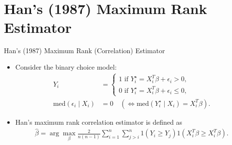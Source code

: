 \documentclass[xcolor=svgnames,dvipdfmx,cjk]{beamer}
\theoremstyle{example}
\begin{document}
\section{Han's (1987) Maximum Rank Estimator}
  
\begin{frame}{Han's (1987) Maximum Rank (Correlation) Estimator}
\begin{itemize}
  \item Consider the binary choice model:
        \begin{align*}
            Y_i &= \left\{
              \begin{array}{l}
                1 \text{ if } Y_i^{\star} = X_i^T \beta + \epsilon_i > 0, 
                \\ 
                0 \text{ if } Y_i^{\star} = X_i^T \beta + \epsilon_i \leq 0,
              \end{array}
              \right. \\
            \text{med}(\epsilon_i \mid X_i) &= 0 \quad(\iff \text{med}(Y_i^{\star}\mid X_i)=X_i^T\beta) .
        \end{align*}
  \item \alert{Han's maximum rank correlation estimator} is defined as
        \begin{align*}
          \hat{\beta} = \arg \max_{\beta} 
                        \frac{2}{n(n-1)}
                        \sum_{i=1}^n \sum_{j>i}^n
                        1(Y_i \geq Y_j) 1(X_i^T \beta \geq X_i^T \beta).
        \end{align*}
\end{itemize}
\end{frame}  
  
\end{document}
